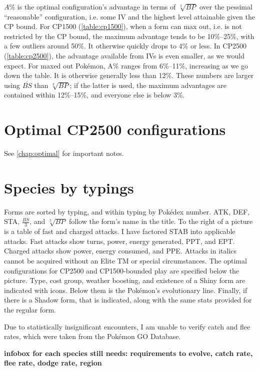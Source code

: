 \documentclass[ebook,10pt,openany,oneside]{memoir}
\begin{document}
$A\%$ is the optimal configuration's advantage in terms of $\sqrt[3]{BP}$
  over the pessimal ``reasonable'' configuration, i.e. some IV
  and the highest level attainable given the CP bound.
For CP1500 (\autoref{table:cp1500}), when a form can max out, i.e. is not restricted by the CP bound,
  the maximum advantage tends to be 10\%--25\%, with a few outliers around 50\%.
It otherwise quickly drops to 4\% or less.
In CP2500 (\autoref{table:cp2500}), the advantage available from IVs is even smaller, as we would expect.
For maxed out Pokémon, A\% ranges from 6\%--11\%, increasing as we go down the table.
It is otherwise generally less than 12\%.
These numbers are larger using $\overline{BS}$ than $\sqrt[3]{BP}$; if the latter is used,
  the maximum advantages are contained within 12\%--15\%, and everyone
  else is below 3\%.


\chapter{Optimal CP2500 configurations}
See \autoref{chap:optimal} for important notes.


\chapter{Species by typings}
\label{chap:speciesbytype}
Forms are sorted by typing, and within typing by Pokédex number.
ATK, DEF, STA, $\frac{BS}{3}$, and $\sqrt[3]{BP}$ follow the form's name in the title.
To the right of a picture is a table of fast and charged attacks.
I have factored STAB into applicable attacks.
Fast attacks show turns, power, energy generated, PPT, and EPT\@.
Charged attacks show power, energy consumed, and PPE\@.
Attacks in italics cannot be acquired without an Elite TM or special circumstances.
The optimal configurations for CP2500 and CP1500-bounded play are specified below the picture.
Type, cost group, weather boosting, and existence of a Shiny form are indicated with icons.
Below them is the Pokémon's evolutionary line.
Finally, if there is a Shadow form, that is indicated, along with the same stats
  provided for the regular form.

Due to statistically insignificant encounters, I am unable to verify catch and flee
  rates, which were taken from the Pokémon GO Database.

\textbf{infobox for each species still needs: requirements to evolve, catch rate, flee rate, dodge rate, region}

\end{document}
